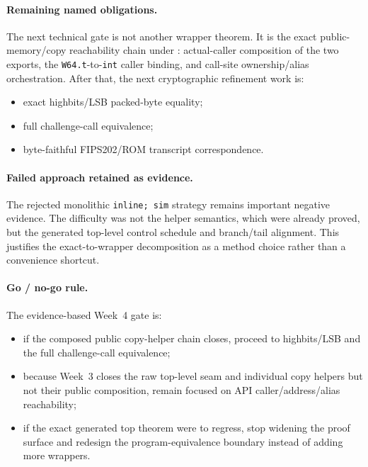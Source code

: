 \paragraph{Remaining named obligations.}
The next technical gate is not another wrapper theorem. It is the exact
public-memory/copy reachability chain under
: actual-caller composition of the two
exports, the \texttt{W64.t}-to-\texttt{int} caller binding, and call-site
ownership/alias orchestration. After that, the next cryptographic refinement
work is:
\begin{itemize}
  \item exact highbits/LSB packed-byte equality;
  \item full challenge-call equivalence;
  \item byte-faithful FIPS202/ROM transcript correspondence.
\end{itemize}

\paragraph{Failed approach retained as evidence.}
The rejected monolithic \texttt{inline; sim} strategy remains important
negative evidence. The difficulty was not the helper semantics, which were
already proved, but the generated top-level control schedule and branch/tail
alignment. This justifies the exact-to-wrapper decomposition as a method choice
rather than a convenience shortcut.

\paragraph{Go / no-go rule.}
The evidence-based Week~4 gate is:
\begin{itemize}
  \item if the composed public copy-helper chain closes, proceed to highbits/LSB and
        the full challenge-call equivalence;
  \item because Week~3 closes the raw top-level seam and individual copy
        helpers but not their public composition, remain focused on API
        caller/address/alias reachability;
  \item if the exact generated top theorem were to regress, stop widening the
        proof surface and redesign the program-equivalence boundary instead of
        adding more wrappers.
\end{itemize}
